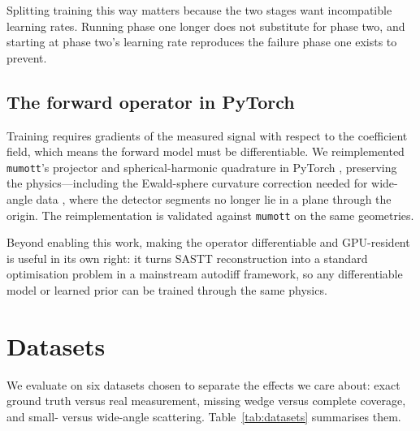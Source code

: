 \documentclass[11pt,a4paper]{article}
\begin{document}
Splitting training this way matters because the two stages want incompatible learning
rates. Running phase one longer does not substitute for phase two, and starting at phase
two's learning rate reproduces the failure phase one exists to prevent.

\subsection{The forward operator in PyTorch}

Training requires gradients of the measured signal with respect to the coefficient field,
which means the forward model must be differentiable. We reimplemented \texttt{mumott}'s
projector and spherical-harmonic quadrature in PyTorch \citep{Paszke2019}, preserving the
physics---including the Ewald-sphere curvature correction needed for wide-angle data
\citep{Carlsen2024}, where the detector segments no longer lie in a plane through the
origin. The reimplementation is validated against \texttt{mumott} on the same geometries.

Beyond enabling this work, making the operator differentiable and GPU-resident is useful
in its own right: it turns SASTT reconstruction into a standard optimisation problem in a
mainstream autodiff framework, so any differentiable model or learned prior can be trained
through the same physics.

\section{Datasets}
\label{sec:datasets}

We evaluate on six datasets chosen to separate the effects we care about: exact ground
truth versus real measurement, missing wedge versus complete coverage, and small- versus
wide-angle scattering. Table~\ref{tab:datasets} summarises them.
\end{document}
